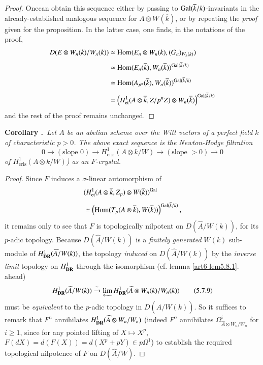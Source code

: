 \begin{proof}
One\pageoriginale can obtain this sequence either by passing to $\operatorname{Gal}(\overline{k}/k)$-in\-variants in the already-established analogous sequence for $A\otimes W(\overline{k})$, or by repeating the {\em proof} given for the proposition. In the latter case, one finds, in the notations of the proof,
\begin{align*}
D(E\otimes W_{n}(k)/W_{n}(k)) &\simeq \operatorname{Hom}(E_{n}\otimes W_{n}(k),(G_{a})_{W_{n}(k)})\\[3pt]
&\simeq \operatorname{Hom}(E_{n}(\overline{k}),W_{n}(\overline{k}))^{\operatorname{Gal}(\overline{k}/k)}\\[3pt]
&\simeq \operatorname{Hom}(A_{p^{n}}(\overline{k}), W_{n}(\overline{k}))^{\operatorname{Gal}(\overline{k}/k)}\\[3pt]
&= \left(H^{1}_{\text{et}}(A\otimes \overline{k},Z/p^{n}Z)\otimes W_{n}(\overline{k})\right)^{\operatorname{Gal}(\overline{k}/k)}
\end{align*}
and the rest of the proof remains unchanged.
\end{proof}

\medskip
\noindent
{\bf Corollary .\label{art6-coro5.7.8}}~{\em Let $A$ be an abelian scheme over the Witt vectors of a perfect field $k$ of characteristic $p>0$. The above exact sequence is the Newton-Hodge filtration}
$$
0\to (\text{slope~}0)\to H^{1}_{\text{cris}}(A\otimes k/W)\to (\text{slope~}>0)\to 0
$$
{\em of $H^{1}_{\text{cris}}(A\otimes k/W)$) as an $F$-crystal.}
\smallskip

\begin{proof}
Since $F$ induces a $\sigma$-linear automorphism of
\begin{align*}
& (H^{1}_{\text{et}}(A\otimes \overline{k},Z_{p})\otimes W(\overline{k}))^{\operatorname{Gal}}\\[3pt]
& \simeq \left(\operatorname{Hom}(T_{p}(A\otimes \overline{k}),W(\overline{k}))\right)^{\operatorname{Gal}(\overline{k}/k)},
\end{align*}
it remains only to see that $F$ is topologically nilpotent on $D(\widehat{A}/W(k))$, for its $p$-adic topology. Because $D(\widehat{A}/W(k))$ is a {\em finitely generated} $W(k)$ sub-module of $H^{1}_{\mathbf{DR}}(\widehat{A}/W(k))$, the topology {\em induced} on $D(\widehat{A}/W(k))$ by the {\em inverse limit} topology on $H^{1}_{\mathbf{DR}}$ through the isomorphism (cf. lemma \ref{art6-lem5.8.1}. ahead)
\begin{equation*}
H^{1}_{\mathbf{DR}}(\widehat{A}/W(k))\xrightarrow{\sim} \varprojlim H^{1}_{\mathbf{DR}}(\widehat{A}\otimes W_{n}(k)/W_{n}(k))\tag{5.7.9}\label{art6-eq5.7.9}
\end{equation*}
must be {\em equivalent} to the $p$-adic topology in $D(\widehat{A}/W(k))$. So it suffices to remark that $F^{n}$ annihilates $H^{1}_{\mathbf{DR}}(\widehat{A}\otimes W_{n}/W_{n})$ (indeed $F^{n}$ annihilates $\Omega^{i}_{\widehat{A}\otimes W_{n}/W_{n}}$ for $i\geq 1$, since for any pointed lifting of $X\mapsto X^{p}$, $F(dX)=d(F(X))=d(X^{p}+pY)\in p\Omega^{1}$) to establish the required topological nilpotence of $F$ on $D(\widehat{A}/W)$. 
\end{proof}

